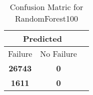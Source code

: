 \begin{table}[] 
\caption{Confusion Matric for RandomForest100} 
\label{Table: Prediction Accuracy-NoneRandomForest10095.0EKF-ignoreReflection-Reflection} 
\centering 
\begin{tabular} 
 {@{}ccc@{}} 
\toprule 
\multicolumn{2}{c}{\textbf{Predicted}}
 \\ \midrule 
\multicolumn{1}{|c|}{Failure} & 
\multicolumn{1}{c|}{No Failure}
 \\ \midrule 
\multicolumn{1}{|c|}{\color{green}\textbf{26743}} & 
\multicolumn{1}{c|}{\color{green}\textbf{0}}
 \\ \midrule 
\multicolumn{1}{|c|}{\color{red}\textbf{1611}} & 
\multicolumn{1}{c|}{\color{green}\textbf{0}}
 \\ \bottomrule 
\end{tabular} 
\end{table} 
